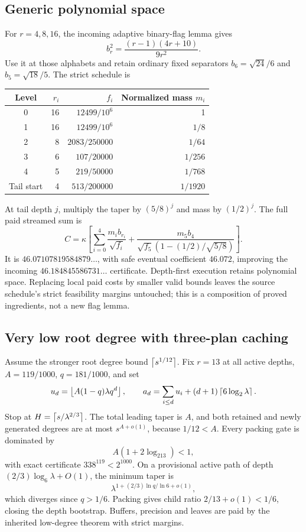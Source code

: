 \documentclass[11pt,letterpaper]{article}
\theoremstyle{remark}\newtheorem{remark}[theorem]{Remark}
\begin{document}
\subsection{Generic polynomial space}
For $r=4,8,16$, the incoming adaptive binary-flag lemma gives
\begin{equation}\label{eq:flag}
 b_r^2=\frac{(r-1)(4r+10)}{9r^2}.
\end{equation}
Use it at those alphabets and retain ordinary fixed separators $b_6=\sqrt{24}/6$ and $b_5=\sqrt{18}/5$. The strict schedule is
\begin{center}\small
\begin{tabular}{@{}crrr@{}}\toprule
Level & $r_i$ & $f_i$ & Normalized mass $m_i$\\\midrule
0&16&$12499/10^6$&1\\
1&16&$12499/10^6$&$1/8$\\
2&8&$2083/250000$&$1/64$\\
3&6&$107/20000$&$1/256$\\
4&5&$219/50000$&$1/768$\\
Tail start&4&$513/200000$&$1/1920$\\\bottomrule
\end{tabular}
\end{center}
At tail depth $j$, multiply the taper by $(5/8)^j$ and mass by $(1/2)^j$. The full paid streamed sum is
\begin{equation}\label{eq:streamed}
 C=\kappa\left[
  \sum_{i=0}^4\frac{m_ib_{r_i}}{\sqrt{f_i}}+
 \frac{m_5b_4}{\sqrt{f_5}\left(1-(1/2)/\sqrt{5/8}\right)}\right].
\end{equation}
It is $46.07107819584879\ldots$, with safe eventual coefficient $46.072$, improving the incoming $46.184845586731\ldots$ certificate. Depth-first execution retains polynomial space. Replacing local paid costs by smaller valid bounds leaves the source schedule's strict feasibility margins untouched; this is a composition of proved ingredients, not a new flag lemma.

\subsection{Very low root degree with three-plan caching}
Assume the stronger root degree bound $\left\lceil s^{1/12}\right\rceil$. Fix $r=13$ at all active depths, $A=119/1000$, $q=181/1000$, and set
\[
 u_d=\left\lfloor A(1-q)\lambda q^d\right\rfloor,\qquad
 a_d=\sum_{i\le d}u_i+(d+1)\left\lceil6\log_2\lambda\right\rceil.
\]
Stop at $H=\left\lceil s/\lambda^{2/3}\right\rceil$. The total leading taper is $A$, and both retained and newly generated degrees are at most $s^{A+o(1)}$, because $1/12<A$. Every packing gate is dominated by
\[
 A(1+2\log_213)<1,
\]
with exact certificate $338^{119}<2^{1000}$. On a provisional active path of depth $(2/3)\log_6\lambda+O(1)$, the minimum taper is
\[
 \lambda^{1+(2/3)\ln q/\ln6+o(1)},
\]
which diverges since $q>1/6$. Packing gives child ratio $2/13+o(1)<1/6$, closing the depth bootstrap. Buffers, precision and leaves are paid by the inherited low-degree theorem with strict margins.
\end{document}
